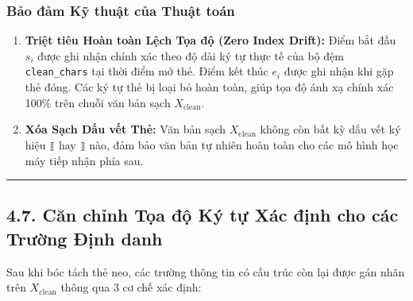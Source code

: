 \documentclass[
  11pt,
  a4paper,
]{article}
\providecommand{\tightlist}{%
  \setlength{\itemsep}{0pt}\setlength{\parskip}{0pt}}
\begin{document}
\subsubsection{Bảo đảm Kỹ thuật của Thuật
toán}\label{bux1ea3o-ux111ux1ea3m-kux1ef9-thuux1eadt-cux1ee7a-thuux1eadt-touxe1n}

\begin{enumerate}
\def\labelenumi{\arabic{enumi}.}
\tightlist
\item
  \textbf{Triệt tiêu Hoàn toàn Lệch Tọa độ (Zero Index Drift):} Điểm bắt đầu \(s_i\) được ghi nhận
  chính xác theo độ dài ký tự thực tế của bộ đệm \texttt{clean\_chars} tại thời điểm mở thẻ. Điểm
  kết thúc \(e_i\) được ghi nhận khi gặp thẻ đóng. Các ký tự thẻ bị loại bỏ hoàn toàn, giúp tọa độ
  ánh xạ chính xác 100\% trên chuỗi văn bản sạch \(X_{\text{clean}}\).
\item
  \textbf{Xóa Sạch Dấu vết Thẻ:} Văn bản sạch \(X_{\text{clean}}\) không còn bất kỳ dấu vết ký hiệu
  \texttt{⟦} hay \texttt{⟧} nào, đảm bảo văn bản tự nhiên hoàn toàn cho các mô hình học máy tiếp
  nhận phía sau.
\end{enumerate}

\begin{center}\rule{0.5\linewidth}{0.5pt}\end{center}

\subsection{4.7. Căn chỉnh Tọa độ Ký tự Xác định cho các Trường Định
danh}\label{cux103n-chux1ec9nh-tux1ecda-ux111ux1ed9-kuxfd-tux1ef1-xuxe1c-ux111ux1ecbnh-cho-cuxe1c-trux1b0ux1eddng-ux111ux1ecbnh-danh}

Sau khi bóc tách thẻ neo, các trường thông tin có cấu trúc còn lại được gán nhãn trên
\(X_{\text{clean}}\) thông qua 3 cơ chế xác định:
\end{document}
